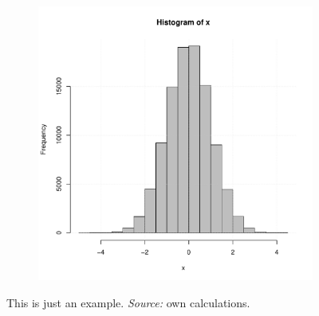 \documentclass[english, twoside, 12pt, a4paper]{article}
\theoremstyle{definition}
\theoremstyle{plain}
\theoremstyle{remark}
\begin{document}
\begin{figure}[hbt]
  \centering

  \begin{subfigure}[t]{0.45\textwidth}
  \includegraphics[width=\textwidth]{./figure-1}
  \end{subfigure}

  \captionsetup{margin=10pt,font=small,labelfont=bf,width=.8\textwidth}

  \caption[Short name]{This is just an example. \textit{Source:} own calculations.}\label{fig:xxx1}
\end{figure}
\end{document}
